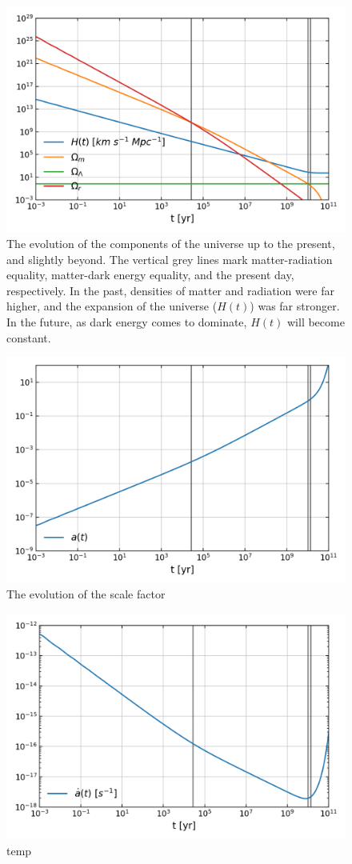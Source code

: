\begin{figure}[!pth]
\centering     %
    \includegraphics[width=.75\columnwidth]{plots/lcdm_components.png}
\caption{
    The evolution of the components of the universe up to the present, and slightly beyond.
    The vertical grey lines mark matter-radiation equality, matter-dark energy equality,
    and the present day, respectively. In the past, densities of matter and radiation were
    far higher, and the expansion of the universe ($H(t)$) was far stronger.
    In the future, as dark energy comes to dominate, $H(t)$ will become constant.
}\label{fig:lcdm_components}
\end{figure}
\begin{figure}[!pth]
\centering     %
    \includegraphics[width=.75\columnwidth]{plots/lcdm_a.png}
\caption{
    The evolution of the scale factor
}\label{fig:lcdm_a}
\end{figure}
\begin{figure}[!pth]
\centering     %
    \includegraphics[width=.75\columnwidth]{plots/lcdm_adot.png}
\caption{
    temp
}\label{fig:lcdm_adot}
\end{figure}
